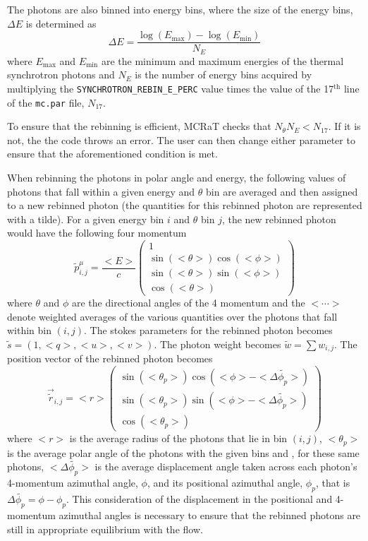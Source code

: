 \documentclass[12pt,a4paper]{article}
\begin{document}
The photons are also binned into energy bins, where the size of the energy bins, $\Delta E$ is determined as 
\begin{equation}
\Delta E=\frac{\log(E_\mathrm{max})-\log(E_\mathrm{min})}{N_E}
\end{equation}
where $E_\mathrm{max}$ and $E_\mathrm{min}$ are the minimum and maximum energies of the thermal synchrotron photons and $N_E$ is the number of energy bins acquired by multiplying the \texttt{SYNCHROTRON\_REBIN\_E\_PERC} value times the value of the 17$^\textrm{th}$ line of the \texttt{mc.par} file, $N_{17}$.

To ensure that the rebinning is efficient, MCRaT checks that $N_\theta N_E<N_{17}$. If it is not, the the code throws an error. The user can then change either parameter to ensure that the aforementioned condition is met.

When rebinning the photons in polar angle and energy, the following values of photons that fall within a given energy and $\theta$ bin are averaged and then assigned to a new rebinned photon (the quantities for this rebinned photon are represented with a tilde). For a given energy bin $i$ and $\theta$ bin $j$, the new rebinned photon would have the following four momentum  
\[
\tilde{p}^\mu_{i,j}=\frac{<E>}{c}\begin{pmatrix}
1 \\ \sin(<\theta>) \cos(<\phi>) \\ \sin(<\theta>) \sin(<\phi>) \\ \cos(<\theta>)
\end{pmatrix}
\]
where $\theta$ and $\phi$ are the directional angles of the 4 momentum and the $<\cdots>$ denote weighted averages of the various quantities over the photons that fall within bin $(i,j)$. The stokes parameters for the rebinned photon becomes $\tilde{s}=(1,<q>,<u>,<v>)$. The photon weight becomes $\tilde{w}=\sum w_{i,j}$. The position vector of the rebinned photon becomes
 \[
 \overrightarrow{\tilde{r}}_{i,j}=<r>\begin{pmatrix}
  \sin(<\theta_p>) \cos(<\phi>-<\Delta \tilde{\phi_p}>) \\ \sin(<\theta_p>) \sin(<\phi>-<\Delta \tilde{\phi_p}>) \\ \cos(<\theta_p>)
 \end{pmatrix}
 \]
 where $<r>$ is the average radius of the photons that lie in bin $(i,j)$, $<\theta_p>$ is the average polar angle of the photons with the given bins and , for these same photons, $<\Delta \tilde{\phi_p}>$ is the average displacement angle taken across each photon's 4-momentum azimuthal angle, $\phi$, and its positional azimuthal angle, $\phi_p$, that is $\Delta \tilde{\phi_p}= \phi-\phi_p$. This consideration of the displacement in the positional and 4-momentum azimuthal angles is necessary to ensure that the rebinned photons are still in appropriate equilibrium with the flow. 
\end{document}
